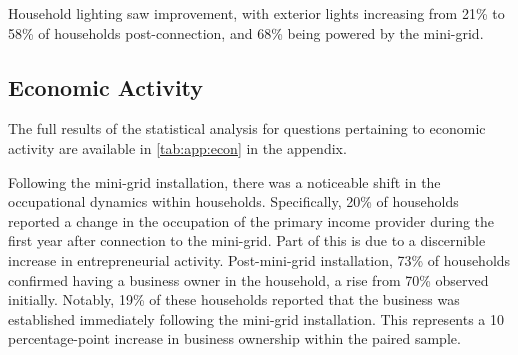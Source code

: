 Household lighting saw improvement, with exterior lights increasing from 21\% to 58\% of households post-connection, and 68\% being powered by the mini-grid.

\subsection{Economic Activity}
The full results of the statistical analysis for questions pertaining to economic activity are available in \cref{tab:app:econ} in the appendix.

Following the mini-grid installation, there was a noticeable shift in the occupational dynamics within households. Specifically, 20\% of households reported a change in the occupation of the primary income provider during the first year after connection to the mini-grid. Part of this is due to a discernible increase in entrepreneurial activity. Post-mini-grid installation, 73\% of households confirmed having a business owner in the household, a rise from 70\% observed initially. Notably, 19\% of these households reported that the business was established immediately following the mini-grid installation. This represents a 10 percentage-point increase in business ownership within the paired sample.


